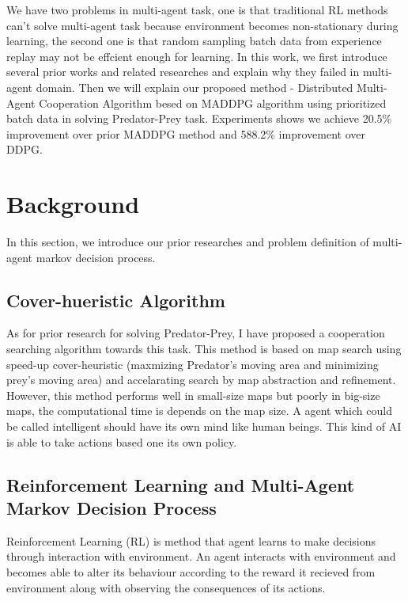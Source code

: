 \documentclass[11pt,twocolumn]{jarticle} %
\begin{document}
We have two problems in multi-agent task, one is that traditional RL methods can't solve multi-agent task because environment becomes non-stationary during learning, the second one is that random sampling batch data from experience replay may not be effcient enough for learning. In this work, we first introduce several prior works and related researches and explain why they failed in multi-agent domain. Then we will explain our proposed method - Distributed Multi-Agent Cooperation Algorithm besed on MADDPG algorithm\cite{maddpg} using prioritized batch data in solving Predator-Prey task. Experiments shows we achieve 20.5\% improvement over prior MADDPG method and 588.2\% improvement over DDPG.\par

\section{Background} 
In this section, we introduce our prior researches and problem definition of multi-agent markov decision process.
\subsection{Cover-hueristic Algorithm\cite{cover}}
As for prior research for solving Predator-Prey, I have proposed a cooperation searching algorithm towards this task. This method is based on map search using speed-up cover-heuristic \cite{cover-heuristic} (maxmizing Predator's moving area and minimizing prey's moving area) and accelarating search by map abstraction and refinement. However, this method performs well in small-size maps but poorly in big-size maps, the computational time is depends on the map size. A agent which could be called intelligent should have its own mind like human beings. This kind of AI is able to take actions based one its own policy.\par


\subsection{Reinforcement Learning and Multi-Agent Markov Decision Process}

Reinforcement Learning (RL) is method that agent learns to make decisions through interaction with environment. An agent interacts with environment and becomes able to alter its behaviour according to the reward it recieved from environment along with observing the consequences of its actions. \par
\end{document}
